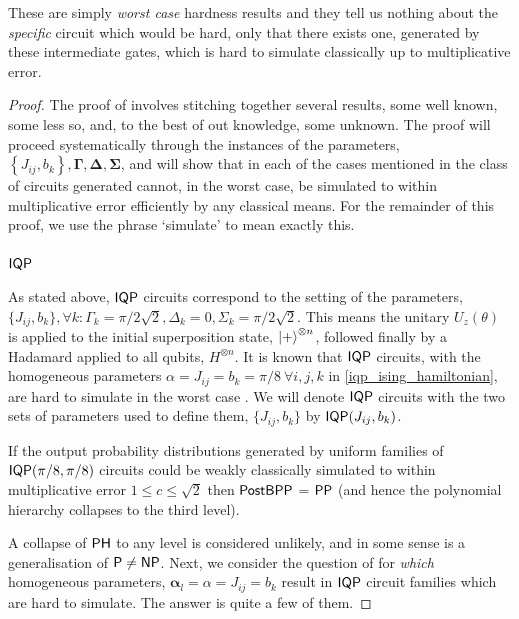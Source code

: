 These are simply \emph{worst case} hardness results and they tell us nothing about the \emph{specific} circuit which would be hard, only that there exists one, generated by these intermediate gates, which is hard to simulate classically up to multiplicative error. 

\begin{proof}

The proof of  involves stitching together several results, some well known, some less so, and, to the best of out knowledge, some unknown. The proof will proceed systematically through the instances of the parameters, $\left\{ J_{ij}, b_{k}\right\}, \mathbf{\Gamma}, \mathbf{\Delta}, \mathbf{\Sigma}$, and will show that in each of the cases mentioned in  the class of circuits generated cannot, in the worst case, be simulated to within multiplicative error efficiently by any classical means. For the remainder of this proof, we use the phrase `simulate' to mean exactly this.

\subsubsection*{\texorpdfstring{$\operatorname{\textsf{IQP}}$}{IQP}}\label{appa:iqphardnessproof}
As stated above, $\operatorname{\textsf{IQP}}$ circuits correspond to the setting of the parameters, $\{J_{ij}, b_{k}\}, \forall k: \Gamma_k = \pi/2\sqrt{2} , \Delta_k = 0, \Sigma_k= \pi/2\sqrt{2} $. This means the unitary $U_z(\theta)$ is applied to the initial superposition state, $\ket{+}^{\otimes n}$, followed finally by a Hadamard applied to all qubits, $H^{\otimes n}$. It is known that $\operatorname{\textsf{IQP}}$ circuits, with the homogeneous parameters $\alpha = J_{ij} = b_{k} =  \pi/8\  \forall i,j,k$ in \eqref{iqp_ising_hamiltonian}, are hard to simulate in the worst case . We will denote $\operatorname{\textsf{IQP}}$ circuits with the two sets of parameters used to define them, $\{J_{ij}, b_k\}$ by $\operatorname{\textsf{IQP}}({J_{ij}}, {b_k})$.

\begin{theorem}\label{thm:iqphardnessbremner}
If the output probability distributions generated by uniform families of $\operatorname{\textsf{IQP}}(\pi/8, \pi/8)$ circuits could be weakly classically simulated to within multiplicative error $1 \leq c \leq \sqrt{2}$ then $\operatorname{\textsf{PostBPP}}$ = $\operatorname{\textsf{PP}}$ (and hence the polynomial hierarchy collapses to the third level).
\end{theorem}

A collapse of $\operatorname{\textsf{PH}}$ to any level is considered unlikely, and in some sense is a generalisation of $\operatorname{\textsf{P}} \neq \operatorname{\textsf{NP}}$.
Next, we consider the question of for \textit{which} homogeneous parameters, $\boldsymbol\alpha_l = \alpha = J_{ij} = b_{k}$ result in $\operatorname{\textsf{IQP}}$ circuit families which are hard to simulate. The answer is quite a few of them.


\end{proof}
